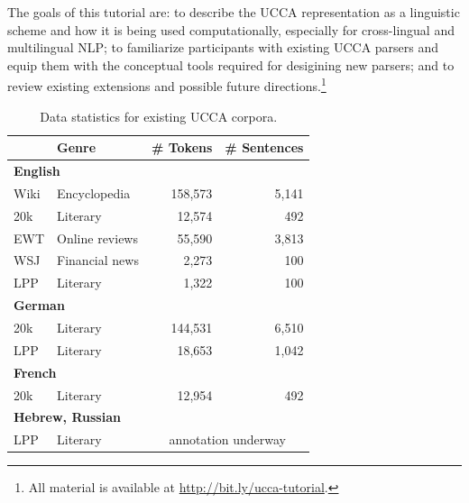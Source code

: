 \documentclass[11pt,table]{article}
\begin{document}
The goals of this tutorial are:
to describe the UCCA representation as a linguistic scheme and how it is
being used computationally, especially for cross-lingual and multilingual
NLP; to familiarize participants with existing UCCA parsers and
equip them with the conceptual tools required for desigining new parsers;
and to review existing extensions and possible future directions.\footnote{All material is available at \url{http://bit.ly/ucca-tutorial}.}

\begin{table}[t]
\centering\setlength{\tabcolsep}{30pt}
\begin{tabular}{ll|rr}
& \bf Genre & \bf \# Tokens & \bf \# Sentences \\
\hline
\multicolumn{2}{l|}{\bf English} \\
Wiki & Encyclopedia & 158,573 & 5,141 \\
20k & Literary & 12,574 & 492 \\
EWT & Online reviews & 55,590 & 3,813 \\
WSJ & Financial news & 2,273 & 100 \\
LPP & Literary & 1,322 & 100 \\\hline
\multicolumn{2}{l|}{\bf German} \\
20k & Literary & 144,531 & 6,510 \\
LPP & Literary & 18,653 & 1,042 \\\hline
\multicolumn{2}{l|}{\bf French} \\
20k & Literary & 12,954 & 492 \\\hline
\multicolumn{2}{l|}{\bf Hebrew, Russian} \\
LPP & Literary & \multicolumn{2}{c}{annotation underway}\\\hline
\end{tabular}
\caption{Data statistics for existing UCCA corpora.\label{tab:data}}
\end{table}
\end{document}
